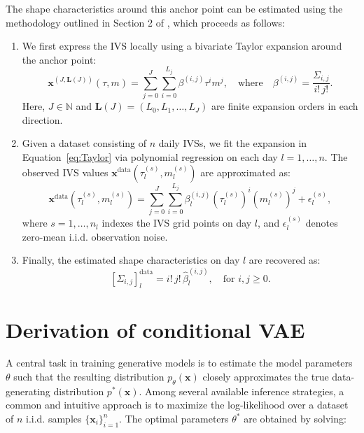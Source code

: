 \documentclass{article}
\begin{document}
{The shape characteristics around this anchor point can be estimated using the methodology outlined in Section 2 of \cite{ait2021implied}, which proceeds as follows:

\begin{enumerate}
    \item We first express the IVS locally using a bivariate Taylor expansion around the anchor point:
    \begin{equation}\label{eq:Taylor}
        \mathbf{x}^{(J, \mathbf{L}(J))}(\tau, m) = \sum_{j=0}^J \sum_{i=0}^{L_j} \beta^{(i, j)} \tau^i m^j, \quad \text{where} \quad \beta^{(i, j)} = \frac{\Sigma_{i,j}}{i!\,j!}.
    \end{equation}
    Here, \( J \in \mathbb{N} \) and \( \mathbf{L}(J) = (L_0, L_1, \dots, L_J) \) are finite expansion orders in each direction.
    
    \item Given a dataset consisting of \( n \) daily IVSs, we fit the expansion in Equation~\eqref{eq:Taylor} via polynomial regression on each day \( l = 1, \dots, n \). The observed IVS values \( \mathbf{x}^{\mathrm{data}}(\tau_l^{(s)}, m_l^{(s)}) \) are approximated as:
    \begin{equation}\label{eq:regr}
        \mathbf{x}^{\mathrm{data}}(\tau_l^{(s)}, m_l^{(s)}) = \sum_{j=0}^J \sum_{i=0}^{L_j} \beta_l^{(i, j)} (\tau_l^{(s)})^i (m_l^{(s)})^j + \epsilon_l^{(s)},
    \end{equation}
    where \( s = 1, \dots, n_l \) indexes the IVS grid points on day \( l \), and \( \epsilon_l^{(s)} \) denotes zero-mean i.i.d. observation noise.
    
    \item Finally, the estimated shape characteristics on day \( l \) are recovered as:
    \begin{equation}\label{eq:labley}
        [\Sigma_{i,j}]_l^{\mathrm{data}} = i!\,j!\,\hat{\beta}_l^{(i,j)}, \quad \text{for } i,j \geq 0.
    \end{equation}
\end{enumerate}



\section{Derivation of conditional VAE}
\label{sec:GaussianLoss}


A central task in training generative models is to estimate the model parameters $\theta$ such that the resulting distribution $p_\theta(\mathbf{x})$ closely approximates the true data-generating distribution $p^*(\mathbf{x})$. Among several available inference strategies, a common and intuitive approach is to maximize the log-likelihood over a dataset of $n$ i.i.d. samples $\{\mathbf{x}_i\}_{i=1}^{n}$. The optimal parameters $\theta^*$ are obtained by solving:

}
\end{document}
